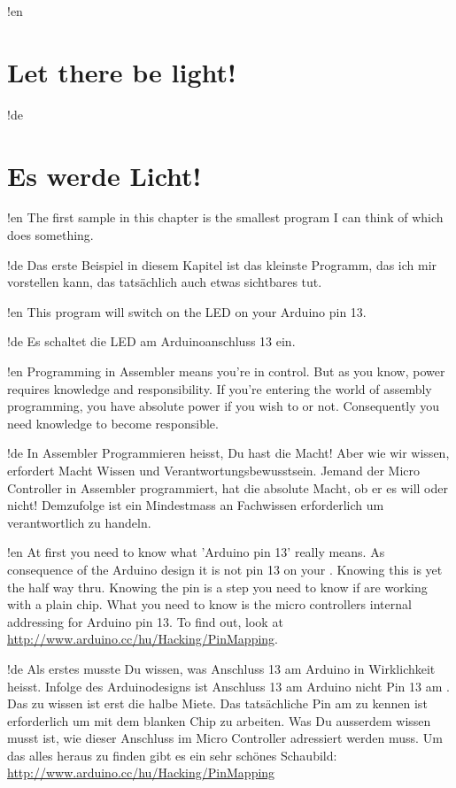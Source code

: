 !en \section{Let there be light!}
!de \section{Es werde Licht!}

!en The first sample in this chapter is the smallest program I can think of which does something.

!de Das erste Beispiel in diesem Kapitel ist das kleinste Programm, das ich mir vorstellen kann, das tatsächlich auch etwas sichtbares tut.



!en This program will switch on the LED on your Arduino pin 13.

!de Es schaltet die LED am Arduinoanschluss 13 ein.



!en Programming in Assembler means you're in control. But as you know, power requires knowledge and responsibility. If you're entering the world of assembly programming, you have absolute power if you wish to or not. Consequently you need knowledge to become responsible.

!de In Assembler Programmieren heisst, Du hast die Macht! Aber wie wir wissen, erfordert Macht Wissen und Verantwortungsbewusstsein. Jemand der Micro Controller in Assembler programmiert, hat die absolute Macht, ob er es will oder nicht! Demzufolge ist ein Mindestmass an Fachwissen erforderlich um verantwortlich zu handeln.



!en At first you need to know what 'Arduino pin 13' really means. As consequence of the Arduino design it is not pin 13 on your \at. Knowing this is yet the half way thru. Knowing the pin is a step you need to know if are working with a plain chip. What you need to know is the micro controllers internal addressing for Arduino pin 13. To find out, look at \url{http://www.arduino.cc/hu/Hacking/PinMapping}.

!de Als erstes musste Du wissen, was Anschluss 13 am Arduino in Wirklichkeit heisst. Infolge des Arduinodesigns ist Anschluss 13 am Arduino nicht Pin 13 am \at. Das zu wissen ist erst die halbe Miete. Das tatsächliche Pin am \at zu kennen ist erforderlich um mit dem blanken Chip zu arbeiten. Was Du ausserdem wissen musst ist, wie dieser Anschluss im Micro Controller adressiert werden muss. Um das alles heraus zu finden gibt es ein sehr schönes Schaubild: \url{http://www.arduino.cc/hu/Hacking/PinMapping}


